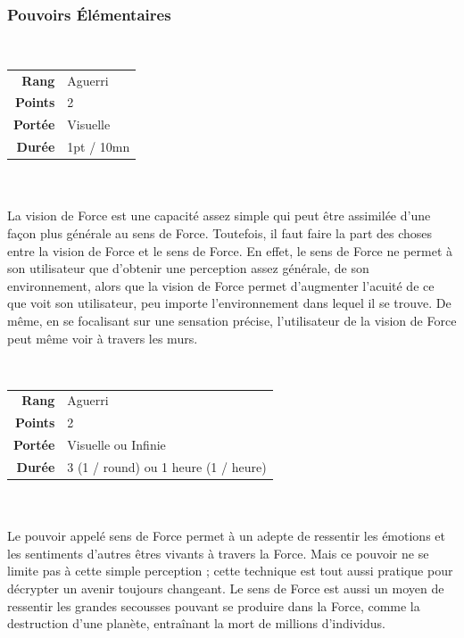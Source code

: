 \subsubsection{Pouvoirs \'Elémentaires}
\begin{description}[align=left] 

    \item [Vision de Force] ~ \\

        \begin{tabular}{ r l }
            \textbf{Rang}    & Aguerri \\
            \textbf{Points}  & 2 \\
            \textbf{Portée}  & Visuelle \\
            \textbf{Durée}   & 1pt / 10mn \\
        \end{tabular}
        \\ \\
    	La vision de Force est une capacité assez simple qui peut être assimilée d’une façon plus générale au sens de Force. Toutefois, il faut faire la part des choses entre la vision de Force et le sens de Force. En effet, le sens de Force ne permet à son utilisateur que d’obtenir une perception assez générale, de son environnement, alors que la vision de Force permet d’augmenter l’acuité de ce que voit son utilisateur, peu importe l’environnement dans lequel il se trouve. De même, en se focalisant sur une sensation précise, l’utilisateur de la vision de Force peut même voir à travers les murs.
        \\

    \item [Sens de Force] ~ \\

        \begin{tabular}{ r l }
            \textbf{Rang}    & Aguerri \\
            \textbf{Points}  & 2 \\
            \textbf{Portée}  & Visuelle ou Infinie \\
            \textbf{Durée}   & 3 (1 / round) ou 1 heure (1 / heure) \\
        \end{tabular}
        \\ \\
        Le pouvoir appelé sens de Force permet à un adepte de ressentir les émotions et les sentiments d’autres êtres vivants à travers la Force. Mais ce pouvoir ne se limite pas à cette simple perception ; cette technique est tout aussi pratique pour décrypter un avenir toujours changeant. Le sens de Force est aussi un moyen de ressentir les grandes secousses pouvant se produire dans la Force, comme la destruction d’une planète, entraînant la mort de millions d’individus. 


\end{description}
